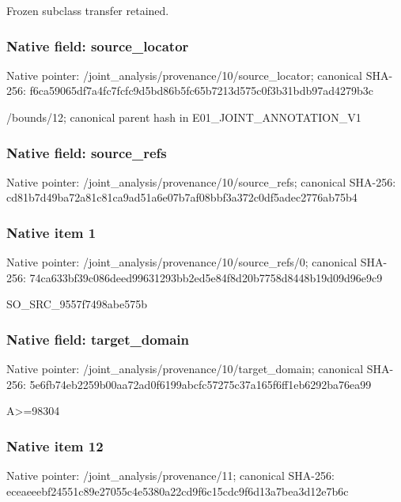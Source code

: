 \documentclass[10pt,a4paper]{article}
\begin{document}
\begingroup\raggedright\sloppy Frozen subclass transfer retained.\par\endgroup

\subsubsection{Native field: source\_\allowbreak{}locator}
Native pointer: /joint\_\allowbreak{}analysis/provenance/10/source\_\allowbreak{}locator; canonical SHA-256: f6ca59065df7a4fc7fcfc9d5bd86b5fc65b7213d575c0f3b31bdb97ad4279b3c

\begingroup\raggedright\sloppy /\allowbreak{}bounds/\allowbreak{}12;\allowbreak{} canonical parent hash in E01\_\allowbreak{}JOINT\_\allowbreak{}ANNOTATION\_\allowbreak{}V1\par\endgroup

\subsubsection{Native field: source\_\allowbreak{}refs}
Native pointer: /joint\_\allowbreak{}analysis/provenance/10/source\_\allowbreak{}refs; canonical SHA-256: cd81b7d49ba72a81c81ca9ad51a6e07b7af08bbf3a372c0df5adec2776ab75b4

\subsubsection{Native item 1}
Native pointer: /joint\_\allowbreak{}analysis/provenance/10/source\_\allowbreak{}refs/0; canonical SHA-256: 74ca633bf39c086deed99631293bb2ed5e84f8d20b7758d8448b19d09d96e9c9

\begingroup\raggedright\sloppy SO\_\allowbreak{}SRC\_\allowbreak{}9557f7498abe575b\par\endgroup

\subsubsection{Native field: target\_\allowbreak{}domain}
Native pointer: /joint\_\allowbreak{}analysis/provenance/10/target\_\allowbreak{}domain; canonical SHA-256: 5e6fb74eb2259b00aa72ad0f6199abcfc57275c37a165f6ff1eb6292ba76ea99

\begingroup\raggedright\sloppy A>=\allowbreak{}98304\par\endgroup

\subsubsection{Native item 12}
Native pointer: /joint\_\allowbreak{}analysis/provenance/11; canonical SHA-256: eceaeeebf24551c89e27055c4e5380a22cd9f6c15cdc9f6d13a7bea3d12e7b6c
\end{document}
